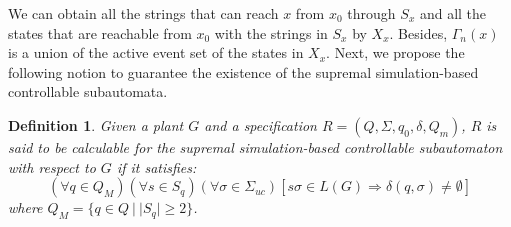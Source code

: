 \documentclass[12pt,draftcls,onecolumn]{IEEEtran}
\newtheorem{Definition}{Definition}
\begin{document}
We can obtain all the strings that can reach $x$ from $x_0$ through
$S_x$ and all the states that are reachable from $x_{0}$ with the
strings in $S_{x}$ by $X_{x}$. Besides, $\Gamma_{n}(x)$ is a union
of the active event set of the states in $X_{x}$. Next, we propose
the following notion to guarantee the existence of the supremal
simulation-based controllable subautomata.
\begin{Definition}
Given a plant $G$ and a specification
$R=(Q,\Sigma,q_{0},\delta,Q_{m})$, $R$ is said to be calculable for
the supremal simulation-based controllable subautomaton with respect
to $G$ if it satisfies:
\[
(\forall q \in Q_{M})(\forall s \in S_q)(\forall \sigma \in
\Sigma_{uc})[s\sigma \in L(G) \Rightarrow \delta(q, \sigma) \neq
\emptyset]
\]
where $Q_{M}=\{q \in Q~|~|S_q| \geq 2\}$.
\end{Definition}
\end{document}
